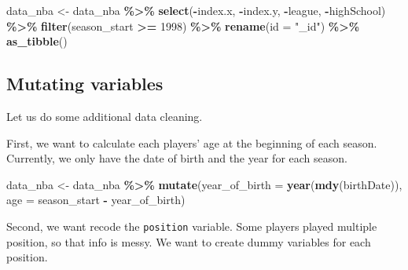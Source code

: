 \documentclass[
]{book}
\newenvironment{Shaded}{\begin{snugshade}}{\end{snugshade}}
\newcommand{\AttributeTok}[1]{\textcolor[rgb]{0.13,0.29,0.53}{#1}}
\newcommand{\DecValTok}[1]{\textcolor[rgb]{0.00,0.00,0.81}{#1}}
\newcommand{\FunctionTok}[1]{\textcolor[rgb]{0.13,0.29,0.53}{\textbf{#1}}}
\newcommand{\NormalTok}[1]{#1}
\newcommand{\OtherTok}[1]{\textcolor[rgb]{0.56,0.35,0.01}{#1}}
\newcommand{\SpecialCharTok}[1]{\textcolor[rgb]{0.81,0.36,0.00}{\textbf{#1}}}
\newcommand{\StringTok}[1]{\textcolor[rgb]{0.31,0.60,0.02}{#1}}
\begin{document}
\begin{Shaded}
\begin{Highlighting}[]
\NormalTok{data\_nba }\OtherTok{\textless{}{-}}\NormalTok{ data\_nba }\SpecialCharTok{\%\textgreater{}\%}
        \FunctionTok{select}\NormalTok{(}\SpecialCharTok{{-}}\NormalTok{index.x, }\SpecialCharTok{{-}}\NormalTok{index.y, }\SpecialCharTok{{-}}\NormalTok{league, }\SpecialCharTok{{-}}\NormalTok{highSchool) }\SpecialCharTok{\%\textgreater{}\%}
        \FunctionTok{filter}\NormalTok{(season\_start }\SpecialCharTok{\textgreater{}=} \DecValTok{1998}\NormalTok{) }\SpecialCharTok{\%\textgreater{}\%} 
        \FunctionTok{rename}\NormalTok{(}\AttributeTok{id =} \StringTok{"\_id"}\NormalTok{) }\SpecialCharTok{\%\textgreater{}\%} 
        \FunctionTok{as\_tibble}\NormalTok{()}
\end{Highlighting}
\end{Shaded}

\hypertarget{mutating-variables}{%
\subsection{Mutating variables}\label{mutating-variables}}

Let us do some additional data cleaning.

First, we want to calculate each players' age at the beginning of each season. Currently, we only have the date of birth and the year for each season.

\begin{Shaded}
\begin{Highlighting}[]
\NormalTok{data\_nba }\OtherTok{\textless{}{-}}\NormalTok{ data\_nba }\SpecialCharTok{\%\textgreater{}\%}
  \FunctionTok{mutate}\NormalTok{(}\AttributeTok{year\_of\_birth =} \FunctionTok{year}\NormalTok{(}\FunctionTok{mdy}\NormalTok{(birthDate)),}
         \AttributeTok{age =}\NormalTok{ season\_start }\SpecialCharTok{{-}}\NormalTok{ year\_of\_birth)}
\end{Highlighting}
\end{Shaded}

Second, we want recode the \texttt{position} variable. Some players played multiple position, so that info is messy. We want to create dummy variables for each position.

\begin{Shaded}
\end{Shaded}
\end{document}
